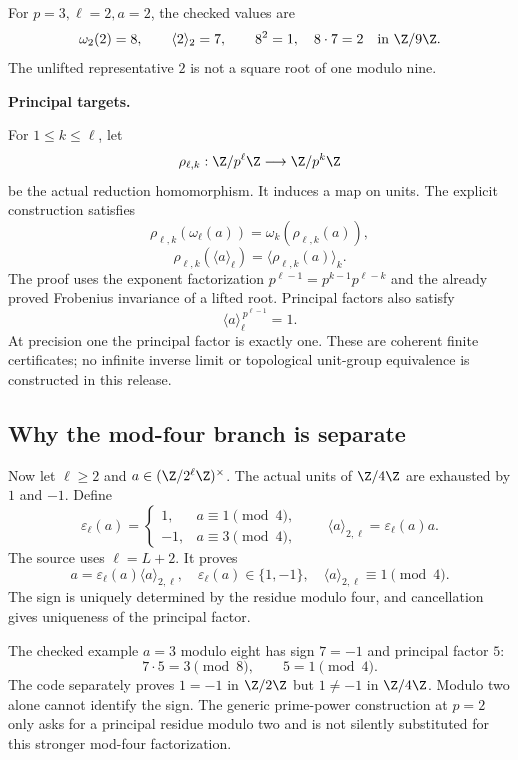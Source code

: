 For $p=3,\ell=2,a=2$, the checked values are
\[
 \omega_2(2)=8,\qquad \langle2\rangle_2=7,\qquad
 8^2=1,\quad8\cdot7=2\quad\text{in }\Z/9\Z.
\]
The unlifted representative $2$ is not a square root of one modulo nine.

\textbf{Principal targets.}\par
{}\par
{}\par
{}
\par\medskip
{}
For $1\leq k\leq\ell$, let
\[
 \rho_{\ell,k}:\Z/p^\ell\Z\longrightarrow\Z/p^k\Z
\]
be the actual reduction homomorphism. It induces a map on units. The explicit construction satisfies
\[
 \boxed{\rho_{\ell,k}(\omega_\ell(a))
 =\omega_k(\rho_{\ell,k}(a)),}
\]
\[
 \boxed{\rho_{\ell,k}(\langle a\rangle_\ell)
 =\langle\rho_{\ell,k}(a)\rangle_k.}
\]
The proof uses the exponent factorization
$p^{\ell-1}=p^{k-1}p^{\ell-k}$ and the already proved Frobenius invariance of a lifted root. Principal factors also satisfy
\[
 \langle a\rangle_\ell^{\,p^{\ell-1}}=1.
\]
At precision one the principal factor is exactly one. These are coherent finite certificates; no infinite inverse limit or topological unit-group equivalence is constructed in this release.

\subsection*{Why the mod-four branch is separate}
Now let $\ell\geq2$ and $a\in(\Z/2^\ell\Z)^\times$. The actual units of $\Z/4\Z$ are exhausted by $1$ and $-1$. Define
\[
 \varepsilon_\ell(a)=
 \begin{cases}1,&a\equiv1\pmod4,\\-1,&a\equiv3\pmod4,\end{cases}
 \qquad
 \langle a\rangle_{2,\ell}=\varepsilon_\ell(a)a.
\]
The source uses $\ell=L+2$. It proves
\[
 \boxed{a=\varepsilon_\ell(a)\langle a\rangle_{2,\ell},\quad
 \varepsilon_\ell(a)\in\{1,-1\},\quad
 \langle a\rangle_{2,\ell}\equiv1\pmod4.}
\]
The sign is uniquely determined by the residue modulo four, and cancellation gives uniqueness of the principal factor.

The checked example $a=3$ modulo eight has sign $7=-1$ and principal factor $5$:
\[
 7\cdot5=3\pmod8,\qquad5=1\pmod4.
\]
The code separately proves $1=-1$ in $\Z/2\Z$ but $1\neq-1$ in $\Z/4\Z$. Modulo two alone cannot identify the sign. The generic prime-power construction at $p=2$ only asks for a principal residue modulo two and is not silently substituted for this stronger mod-four factorization.

